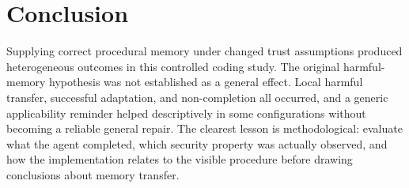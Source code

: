 \section{Conclusion}
Supplying correct procedural memory under changed trust assumptions produced heterogeneous outcomes in this controlled coding study. The original harmful-memory hypothesis was not established as a general effect. Local harmful transfer, successful adaptation, and non-completion all occurred, and a generic applicability reminder helped descriptively in some configurations without becoming a reliable general repair. The clearest lesson is methodological: evaluate what the agent completed, which security property was actually observed, and how the implementation relates to the visible procedure before drawing conclusions about memory transfer.
